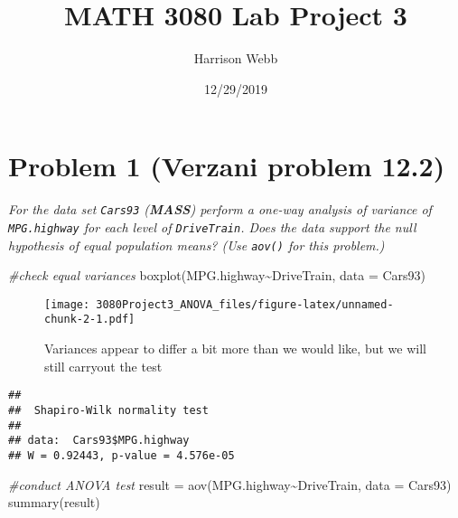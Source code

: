 \documentclass[
]{article}
\title{MATH 3080 Lab Project 3}
\author{Harrison Webb}
\date{12/29/2019}
\newenvironment{Shaded}{\begin{snugshade}}{\end{snugshade}}
\newcommand{\AttributeTok}[1]{\textcolor[rgb]{0.77,0.63,0.00}{#1}}
\newcommand{\CommentTok}[1]{\textcolor[rgb]{0.56,0.35,0.01}{\textit{#1}}}
\newcommand{\FunctionTok}[1]{\textcolor[rgb]{0.00,0.00,0.00}{#1}}
\newcommand{\NormalTok}[1]{#1}
\newcommand{\OtherTok}[1]{\textcolor[rgb]{0.56,0.35,0.01}{#1}}
\newcommand{\SpecialCharTok}[1]{\textcolor[rgb]{0.00,0.00,0.00}{#1}}
\begin{document}
\maketitle

{
\setcounter{tocdepth}{2}
\tableofcontents
}
\hypertarget{problem-1-verzani-problem-12.2}{%
\section{Problem 1 (Verzani problem
12.2)}\label{problem-1-verzani-problem-12.2}}

\emph{For the data set \texttt{Cars93} (\textbf{MASS}) perform a one-way
analysis of variance of \texttt{MPG.highway} for each level of
\texttt{DriveTrain}. Does the data support the null hypothesis of equal
population means? (Use \texttt{aov()} for this problem.)}

\begin{Shaded}
\begin{Highlighting}[]
\CommentTok{\#check equal variances}
\FunctionTok{boxplot}\NormalTok{(MPG.highway}\SpecialCharTok{\textasciitilde{}}\NormalTok{DriveTrain, }\AttributeTok{data =}\NormalTok{ Cars93)}
\end{Highlighting}
\end{Shaded}

\begin{figure}
\centering
\texttt{[image: 3080Project3\_ANOVA\_files/figure-latex/unnamed-chunk-2-1.pdf]}
\caption{Variances appear to differ a bit more than we would like, but
we will still carryout the test}
\end{figure}

\begin{Shaded}
\end{Shaded}

\begin{verbatim}
## 
##  Shapiro-Wilk normality test
## 
## data:  Cars93$MPG.highway
## W = 0.92443, p-value = 4.576e-05
\end{verbatim}

\begin{Shaded}
\begin{Highlighting}[]
\CommentTok{\#conduct ANOVA test}
\NormalTok{result }\OtherTok{=} \FunctionTok{aov}\NormalTok{(MPG.highway}\SpecialCharTok{\textasciitilde{}}\NormalTok{DriveTrain, }\AttributeTok{data =}\NormalTok{ Cars93)}
\FunctionTok{summary}\NormalTok{(result)}
\end{Highlighting}
\end{Shaded}
\end{document}
